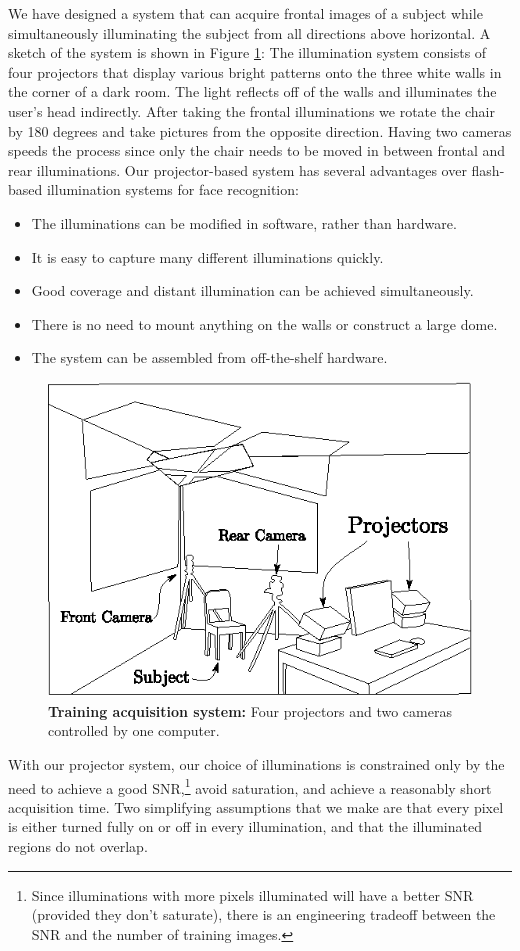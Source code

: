 \documentclass[10pt,journal,letterpaper,compsoc]{IEEEtran}
\begin{document}
We have designed a system that can acquire frontal images of a subject while
simultaneously illuminating the subject from all directions above horizontal. A sketch of the
system is shown in Figure \ref{fig:system}: The illumination
system consists of four projectors that display various bright
patterns onto the three white walls in the corner of a dark
room.  The light reflects off of the walls and illuminates the
user's head indirectly.  After taking the frontal illuminations
we rotate the chair by 180 degrees and take pictures from the
opposite direction.  Having two cameras speeds the process
since only the chair needs to be moved in between frontal and
rear illuminations. Our projector-based system has several
advantages over flash-based illumination systems for face recognition:
\begin{itemize}
\item The illuminations can be modified in software, rather than hardware.
\item It is easy to capture many different illuminations quickly.
\item Good coverage and distant illumination can be achieved simultaneously.
\item There is no need to mount anything on the walls or construct a large dome.
\item The system can be assembled from off-the-shelf hardware.
\end{itemize}
\begin{figure}
\centering
\includegraphics{Figure_6}
\caption{{\bf Training acquisition system:} Four projectors and two cameras controlled by one computer.}
\vspace{-2em}
\label{fig:system}
\end{figure}
With our projector system, our choice of illuminations is
constrained only by the need to achieve a good
SNR,\footnote{Since illuminations with more pixels illuminated
will have a better SNR (provided they don't saturate), there is
an engineering tradeoff between the SNR and the number of
training images.} avoid saturation, and achieve a reasonably
short acquisition time.  Two simplifying assumptions that we
make are that every pixel is either turned fully on or off in
every illumination, and that the illuminated regions do not
overlap.
\end{document}
